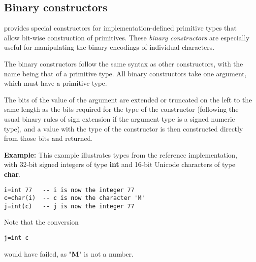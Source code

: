 \subsection{Binary constructors}\label{refbincon}
 
\nr{} provides special constructors for implementation-defined
primitive types that allow bit-wise construction of primitives.
These \emph{binary constructors} are especially useful for
manipulating the binary encodings of individual characters.
 
The binary constructors follow the same syntax as other constructors,
with the name being that of a primitive type.  All binary constructors
take one argument, which must have a primitive type.
 
The bits of the value of the argument are extended or truncated on the
left to the same length as the bits required for the type of the
constructor (following the usual binary rules of sign extension if the
argument type is a signed numeric type), and a value with the type of
the constructor is then constructed directly from those bits and
returned.

\textbf{Example:}
 This example illustrates types from the reference implementation,
with 32-bit signed integers of type \textbf{int} and 16-bit Unicode
characters of type \textbf{char}.
\begin{lstlisting}
i=int 77   -- i is now the integer 77
c=char(i)  -- c is now the character 'M'
j=int(c)   -- j is now the integer 77
\end{lstlisting}
Note that the conversion
\begin{lstlisting}
j=int c
\end{lstlisting}
would have failed, as "\textbf{M}" is not a number.
